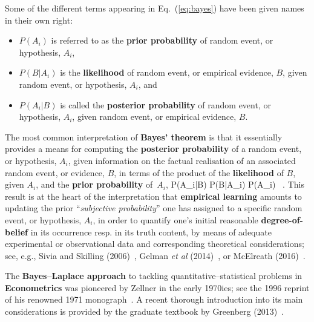 \medskip
\noindent
Some of the different terms appearing in Eq.~(\ref{eq:bayes}) have 
been given names in their own right:
%
\begin{itemize}

\item $P(A_{i})$ is referred to as the \textbf{prior probability}
of random event, or hypothesis, $A_{i}$,

\item $P(B|A_{i})$ is the \textbf{likelihood} of random event,
or empirical evidence, $B$, given random event, or hypothesis,
$A_{i}$, and

\item $P(A_{i}|B)$ is called the \textbf{posterior probability} of 
random event, or hypothesis, $A_{i}$, given random event,
or empirical evidence, $B$.

\end{itemize}
%

\medskip
\noindent
The most common interpretation of \textbf{Bayes' theorem} is 
that it essentially provides a means for computing the
\textbf{posterior probability} of a random event, or hypothesis,
$A_{i}$, given information on the factual realisation of an
associated random event, or evidence, $B$, in terms of the product
of the \textbf{likelihood} of $B$, given $A_{i}$, and the
\textbf{prior probability} of~$A_{i}$,
%
\be
{}
P(A_{i}|B) \propto P(B|A_{i}) \times P(A_{i}) \ .
\ee
%
This result
is at the heart of the interpretation that \textbf{empirical 
learning} amounts to updating the prior ``\textit{subjective 
probability}'' one has assigned to a specific random 
event, or hypothesis, $A_{i}$, in order to quantify one's initial
reasonable \textbf{degree-of-belief} in its occurrence resp. in its
truth content, by means of adequate experimental or observational
data and corresponding theoretical considerations; see, e.g., Sivia
and Skilling (2006)~, Gelman \textit{et al}
(2014)~, or McElreath
(2016)~.

\medskip
\noindent
The \textbf{Bayes--Laplace approach} to tackling 
quantitative--statistical problems in \textbf{Econometrics} was 
pioneered by Zellner in the early 1970ies; see the 1996 reprint of 
his renowned 1971 monograph~. A recent thorough 
introduction into its main considerations is provided by the 
graduate textbook by Greenberg (2013)~.

